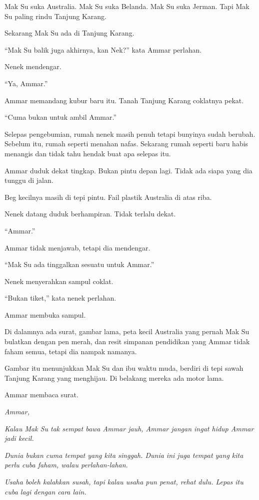 \documentclass[
  11pt,
  a5paper,
  openany,
  oneside]{book}
\begin{document}
Mak Su suka Australia. Mak Su suka Belanda. Mak Su suka Jerman. Tapi Mak
Su paling rindu Tanjung Karang.

Sekarang Mak Su ada di Tanjung Karang.

``Mak Su balik juga akhirnya, kan Nek?'' kata Ammar perlahan.

Nenek mendengar.

``Ya, Ammar.''

Ammar memandang kubur baru itu. Tanah Tanjung Karang coklatnya pekat.

``Cuma bukan untuk ambil Ammar.''

Selepas pengebumian, rumah nenek masih penuh tetapi bunyinya sudah
berubah. Sebelum itu, rumah seperti menahan nafas. Sekarang rumah
seperti baru habis menangis dan tidak tahu hendak buat apa selepas itu.

Ammar duduk dekat tingkap. Bukan pintu depan lagi. Tidak ada siapa yang
dia tunggu di jalan.

Beg kecilnya masih di tepi pintu. Fail plastik Australia di atas riba.

Nenek datang duduk berhampiran. Tidak terlalu dekat.

``Ammar.''

Ammar tidak menjawab, tetapi dia mendengar.

``Mak Su ada tinggalkan sesuatu untuk Ammar.''

Nenek menyerahkan sampul coklat.

``Bukan tiket,'' kata nenek perlahan.

Ammar membuka sampul.

Di dalamnya ada surat, gambar lama, peta kecil Australia yang pernah Mak
Su bulatkan dengan pen merah, dan resit simpanan pendidikan yang Ammar
tidak faham semua, tetapi dia nampak namanya.

Gambar itu menunjukkan Mak Su dan ibu waktu muda, berdiri di tepi sawah
Tanjung Karang yang menghijau. Di belakang mereka ada motor lama.

Ammar membaca surat.

\emph{Ammar,}

\emph{Kalau Mak Su tak sempat bawa Ammar jauh, Ammar jangan ingat hidup
Ammar jadi kecil.}

\emph{Dunia bukan cuma tempat yang kita singgah. Dunia ini juga tempat
yang kita perlu cuba faham, walau perlahan-lahan.}

\emph{Usaha boleh kalahkan susah, tapi kalau usaha pun penat, rehat
dulu. Lepas itu cuba lagi dengan cara lain.}
\end{document}
